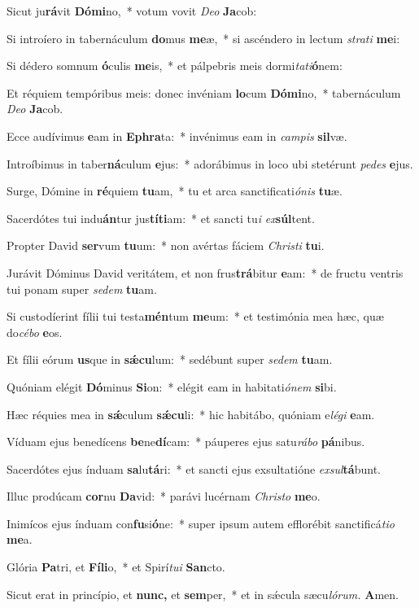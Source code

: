 \item Sicut ju\textbf{rá}vit \textbf{Dó}\textbf{mi}no,~* votum vovit \textit{Deo} \textbf{Ja}cob:
\item Si introíero in tabernáculum \textbf{do}mus \textbf{me}æ,~* si ascéndero in le\-ctum \textit{strati} \textbf{me}i:
\item Si dédero somnum \textbf{ó}culis \textbf{me}is,~* et pálpebris meis dormi\textit{tati}\textbf{ó}nem:
\item Et réquiem tempóribus meis: donec invéniam \textbf{lo}cum \textbf{Dó}\textbf{mi}no,~* tabernáculum \textit{Deo} \textbf{Ja}cob.
\item Ecce audívimus \textbf{e}am in \textbf{E}\textbf{phra}ta:~* invénimus eam in \textit{campis} \textbf{sil}væ.
\item Introíbimus in taber\textbf{ná}culum \textbf{e}jus:~* adorábimus in loco ubi stetérunt \textit{pedes} \textbf{e}jus.
\item Surge, Dómine in \textbf{ré}quiem \textbf{tu}am,~* tu et arca sanctificati\textit{ónis} \textbf{tu}æ.
\item Sacerdótes tui indu\textbf{án}tur jus\textbf{tí}\textbf{ti}am:~* et sancti tu\tinyhspace\textit{i} \textit{ex}\teenyhspace\textbf{súl}tent.
\item Propter David \textbf{ser}vum \textbf{tu}um:~* non avértas fáciem \textit{Christi} \textbf{tu}i.
\item Jurávit Dóminus David veritátem, et non frus\textbf{trá}bitur \textbf{e}am:~* de fru\-ctu ventris tui ponam super \textit{sedem} \textbf{tu}am.
\item Si custodíerint fílii tui testa\textbf{mén}tum \textbf{me}um:~* et testimónia mea hæc, quæ do\tinyhspace\textit{cébo} \textbf{e}os.
\item Et fílii eórum \textbf{us}que in \textbf{sǽ}\textbf{cu}lum:~* sedébunt super \textit{sedem} \textbf{tu}am.
\item Quóniam elégit \textbf{Dó}minus \textbf{Si}on:~* elégit eam in habitati\tinyhspace\textit{ónem} \textbf{si}bi.
\item Hæc réquies mea in \textbf{sǽ}culum \textbf{sǽ}\textbf{cu}li:~* hic habitábo, quóniam e\textit{légi} \textbf{e}am.
\item Víduam ejus benedícens \textbf{be}ne\textbf{dí}cam:~* páuperes ejus satu\tinyhspace\textit{rábo} \textbf{pá}nibus.
\item Sacerdótes ejus índuam \textbf{sa}lu\textbf{tá}ri:~* et sancti ejus exsultatióne \textit{exsul}\textbf{tá}bunt.
\item Illuc prodúcam \textbf{cor}nu \textbf{Da}vid:~* parávi lucérnam \textit{Christo} \textbf{me}o.
\item Inimícos ejus índuam con\textbf{fu}si\textbf{ó}ne:~* super i\-psum autem efflorébit sanctificá\tinyhspace\textit{tio} \textbf{me}a.
\item Glória \textbf{Pa}tri, et \textbf{Fí}\textbf{li}o,~* et Spirí\tinyhspace\textit{tui} \textbf{San}cto.
\item Sicut erat in princípio, et \textbf{nunc,} et \textbf{sem}per,~* et in sǽcula sæcu\tinyhspace\textit{lórum.} \textbf{A}men.
